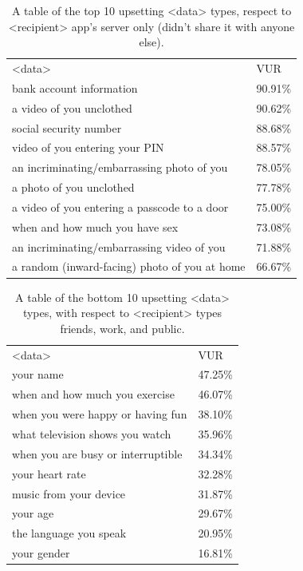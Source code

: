 \documentclass{acm_proc_article-sp}
\begin{document}
\begin{table}%
\begin{center}
\begin{tabular}{ll}
<data> &  VUR  \\
bank account information & 90.91\% \\
a video of you unclothed & 90.62\% \\
social security number  & 88.68\% \\
video of you entering your PIN & 88.57\% \\
an incriminating/embarrassing photo of you & 78.05\% \\
a photo of you unclothed & 77.78\% \\
a video of you entering a passcode to a door & 75.00\% \\
when and how much you have sex & 73.08\% \\
an incriminating/embarrassing video of you & 71.88\% \\
a random (inward-facing) photo of you at home & 66.67\% \\
\end{tabular}
\caption{A table of the top 10 upsetting <data> types, respect to <recipient> app's server only (didn't share it with anyone else).}
\label{notsharedtop10}
\end{center}
\end{table}

\begin{table}%
\begin{center}
\begin{tabular}{ll}
<data> &  VUR  \\
your name & 47.25\% \\
when and how much you exercise & 46.07\% \\
when you were happy or having fun & 38.10\% \\
what television shows you watch & 35.96\% \\
when you are busy or interruptible & 34.34\% \\
your heart rate & 32.28\% \\
music from your device & 31.87\% \\
your age & 29.67\% \\
the language you speak & 20.95\% \\
your gender & 16.81\% \\
\end{tabular}
\caption{A table of the bottom 10 upsetting <data> types, with respect to <recipient> types friends, work, and public.}
\label{sharedbottom10}
\end{center}
\end{table}
\end{document}
